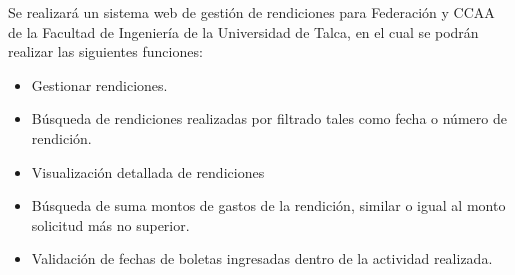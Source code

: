 

Se realizará un sistema web de gestión de rendiciones para Federación y CCAA de la Facultad de Ingeniería de la Universidad de Talca, en el cual se podrán realizar las siguientes funciones:

\begin{itemize}
	\item Gestionar rendiciones.
	
	\item Búsqueda de rendiciones realizadas por filtrado tales como fecha o número de rendición.
	
	\item Visualización detallada de rendiciones
	
	\item Búsqueda de suma montos de gastos de la rendición, similar o igual al monto solicitud más no superior.
	
	\item Validación de fechas de boletas ingresadas dentro de la actividad realizada.
\end{itemize}








